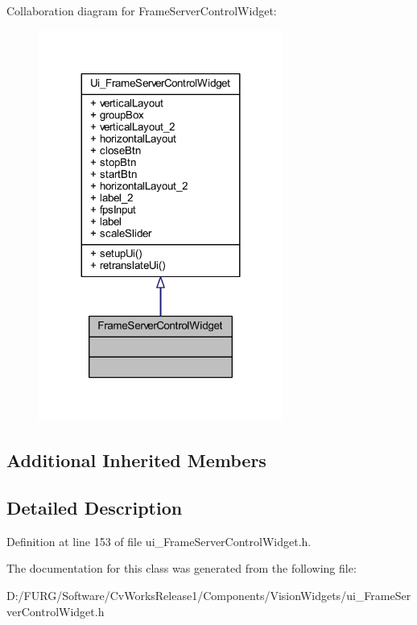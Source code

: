 Collaboration diagram for Frame\+Server\+Control\+Widget\+:
\nopagebreak
\begin{figure}[H]
\begin{center}
\leavevmode
\includegraphics[width=227pt]{class_ui_1_1_frame_server_control_widget__coll__graph}
\end{center}
\end{figure}
\subsection*{Additional Inherited Members}


\subsection{Detailed Description}


Definition at line 153 of file ui\+\_\+\+Frame\+Server\+Control\+Widget.\+h.



The documentation for this class was generated from the following file\+:\begin{DoxyCompactItemize}
\item 
D\+:/\+F\+U\+R\+G/\+Software/\+Cv\+Works\+Release1/\+Components/\+Vision\+Widgets/ui\+\_\+\+Frame\+Server\+Control\+Widget.\+h\end{DoxyCompactItemize}
